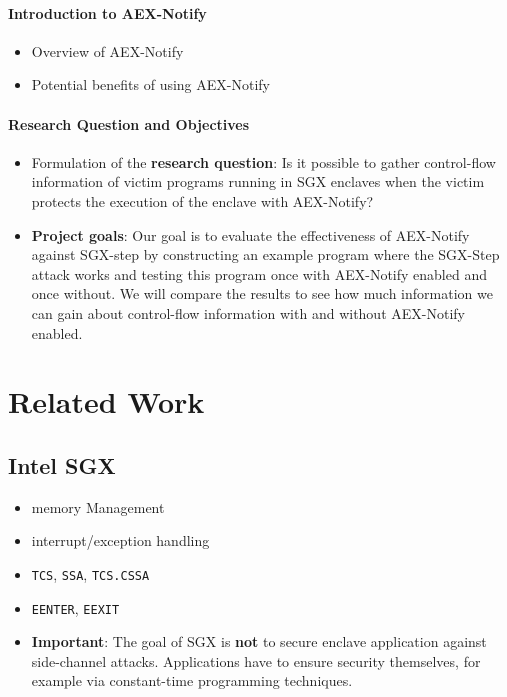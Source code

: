 \documentclass{llncs}
\begin{document}
\paragraph{Introduction to AEX-Notify}
\begin{itemize}
  \item Overview of AEX-Notify
  \item Potential benefits of using AEX-Notify
\end{itemize}

\paragraph{Research Question and Objectives}
\begin{itemize}
  \item Formulation of the \textbf{research question}:
    Is it possible to gather control-flow information of victim programs running
    in SGX enclaves when the victim protects the execution of the enclave with
    AEX-Notify?
  \item \textbf{Project goals}:
    Our goal is to evaluate the effectiveness of AEX-Notify against SGX-step by
    constructing an example program where the SGX-Step attack works and testing
    this program once with AEX-Notify enabled and once without. We will compare
    the results to see how much information we can gain about control-flow
    information with and without AEX-Notify enabled.
\end{itemize}

\section{Related Work}


\subsection{Intel SGX}

\begin{itemize}
  \item memory Management
  \item interrupt/exception handling
  \item \texttt{TCS}, \texttt{SSA}, \texttt{TCS.CSSA}
  \item \texttt{EENTER}, \texttt{EEXIT}
  \item \textbf{Important}: The goal of SGX is \textbf{not} to secure enclave application against
    side-channel attacks.
    Applications have to ensure security themselves, for example via
    constant-time programming techniques.
\end{itemize}
\end{document}
